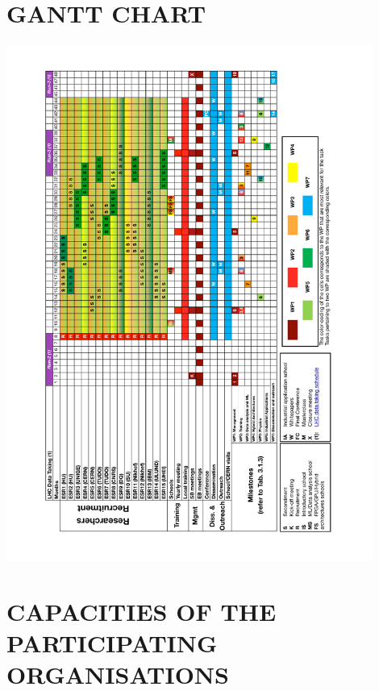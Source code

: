 \documentclass[11pt,a4paper]{article}
\begin{document}
\section*{GANTT CHART}
\label{sec:gantt} 

{	\centering 
	\includegraphics[width=0.9\textwidth]{figs/gantt_v2}
}



\clearpage 

\section{CAPACITIES OF THE PARTICIPATING ORGANISATIONS}
\end{document}

